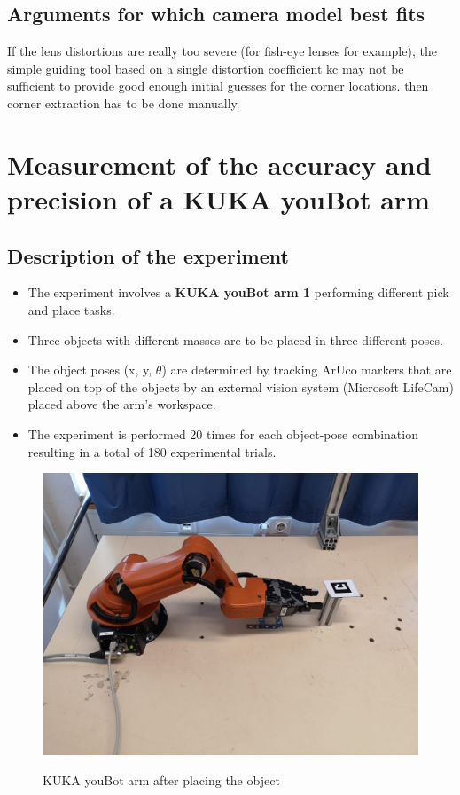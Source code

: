 \documentclass[11pt,a4paper]{article}
\begin{document}
				
				\subsection{Arguments for which camera model best fits} 
				If the lens distortions are really too severe (for fish-eye lenses for example), the simple guiding tool based on a single distortion coefficient kc may not be sufficient to provide good enough initial guesses for the corner locations. then corner extraction has to be done manually.
				
				\newpage
				\section{Measurement of the accuracy and precision of a KUKA youBot arm}
				\subsection{Description of the experiment}
				\begin{itemize}
				\item The experiment involves a \textbf{KUKA youBot arm 1} performing different pick and place tasks.
				\item Three objects with different masses are to be placed in three different poses.
				\item The object poses (x, y, $\theta$) are determined by tracking ArUco markers that are placed on top of the objects by an external vision system (Microsoft LifeCam) placed above the arm's workspace.
				\item The experiment is performed 20 times for each object-pose combination resulting in a total of 180 experimental trials.
				\end{itemize}
				\begin{figure}[H]
					\centering
					\includegraphics[scale=0.2]{youbot_1}
					\label{Youbot}
					\caption{KUKA youBot arm after placing the object }
				\end{figure}
\end{document}
